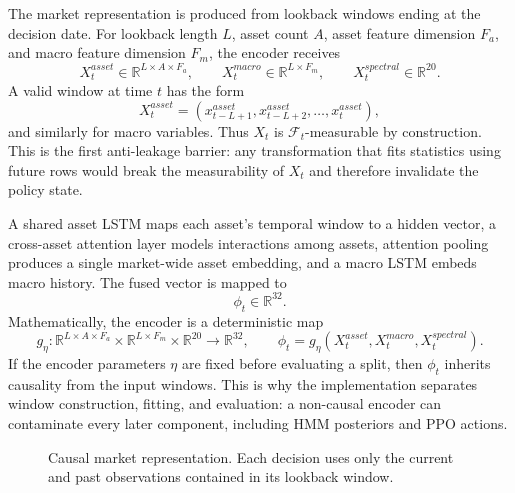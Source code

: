 \documentclass[11pt]{article}
\newcommand{\R}{\mathbb{R}}
\newcommand{\1}{\mathbf{1}}
\begin{document}
The market representation is produced from lookback windows ending at the
decision date. For lookback length $L$, asset count $A$, asset feature dimension
$F_a$, and macro feature dimension $F_m$, the encoder receives
\[
X^{asset}_t \in \R^{L \times A \times F_a},
\qquad
X^{macro}_t \in \R^{L \times F_m},
\qquad
X^{spectral}_t \in \R^{20}.
\]
A valid window at time $t$ has the form
\[
X^{asset}_t =
\left(x^{asset}_{t-L+1},x^{asset}_{t-L+2},\ldots,x^{asset}_{t}\right),
\]
and similarly for macro variables. Thus $X_t$ is
$\mathcal{F}_t$-measurable by construction. This is the first anti-leakage
barrier: any transformation that fits statistics using future rows would break
the measurability of $X_t$ and therefore invalidate the policy state.

A shared asset LSTM maps each asset's temporal window to a hidden vector, a
cross-asset attention layer models interactions among assets, attention pooling
produces a single market-wide asset embedding, and a macro LSTM embeds macro
history. The fused vector is mapped to
\[
\phi_t \in \R^{32}.
\]
Mathematically, the encoder is a deterministic map
\[
g_\eta:
\R^{L\times A\times F_a}\times \R^{L\times F_m}\times \R^{20}
\rightarrow \R^{32},
\qquad
\phi_t=g_\eta(X^{asset}_t,X^{macro}_t,X^{spectral}_t).
\]
If the encoder parameters $\eta$ are fixed before evaluating a split, then
$\phi_t$ inherits causality from the input windows. This is why the
implementation separates window construction, fitting, and evaluation: a
non-causal encoder can contaminate every later component, including HMM
posteriors and PPO actions.

\begin{figure}[ht]
\centering
{}
\caption{Causal market representation. Each decision uses only the current and
past observations contained in its lookback window.}
\end{figure}
\end{document}
